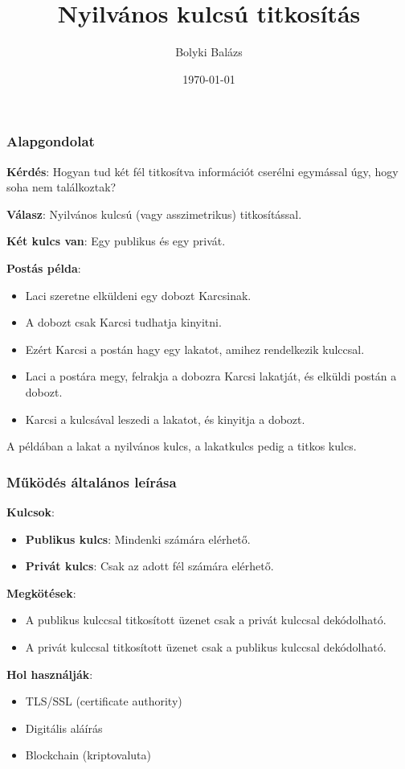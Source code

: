 \documentclass{beamer}
\title{Nyilvános kulcsú titkosítás}
\author{Bolyki Balázs}
\institute{Miskolci Egyetem}
\date{\today}
\begin{document}
\titlepage

\begin{frame}
    \frametitle{Alapgondolat}
    \textbf{Kérdés}: Hogyan tud két fél titkosítva információt cserélni egymással úgy, hogy soha nem találkoztak?

    \textbf{Válasz}: Nyilvános kulcsú (vagy asszimetrikus) titkosítással.

    \textbf{Két kulcs van}: Egy publikus és egy privát.

    \textbf{Postás példa}:

    \begin{itemize}
        \item Laci szeretne elküldeni egy dobozt Karcsinak.
        \item A dobozt csak Karcsi tudhatja kinyitni.
        \item Ezért Karcsi a postán hagy egy lakatot, amihez rendelkezik kulccsal.
        \item Laci a postára megy, felrakja a dobozra Karcsi lakatját, és elküldi postán a dobozt.
        \item Karcsi a kulcsával leszedi a lakatot, és kinyitja a dobozt.
    \end{itemize}

    A példában a lakat a nyilvános kulcs, a lakatkulcs pedig a titkos kulcs.

\end{frame}

\begin{frame}
    \frametitle{Működés általános leírása}

    \textbf{Kulcsok}:
    \begin{itemize}
        \item \textbf{Publikus kulcs}: Mindenki számára elérhető.
        \item \textbf{Privát kulcs}: Csak az adott fél számára elérhető.
    \end{itemize}
    \textbf{Megkötések}:
    \begin{itemize}
        \item A publikus kulccsal titkosított üzenet csak a privát kulccsal dekódolható.
        \item A privát kulccsal titkosított üzenet csak a publikus kulccsal dekódolható.
    \end{itemize}

    \textbf{Hol használják}:
    \begin{itemize}
        \item TLS/SSL (certificate authority)
        \item Digitális aláírás
        \item Blockchain (kriptovaluta)
    \end{itemize}
\end{frame}
\end{document}
